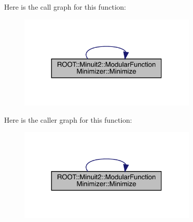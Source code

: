 Here is the call graph for this function\+:\nopagebreak
\begin{figure}[H]
\begin{center}
\leavevmode
\includegraphics[width=242pt]{d3/dc8/classROOT_1_1Minuit2_1_1ModularFunctionMinimizer_a83b8641b6e3662f763c79c3fcb014838_cgraph}
\end{center}
\end{figure}
Here is the caller graph for this function\+:\nopagebreak
\begin{figure}[H]
\begin{center}
\leavevmode
\includegraphics[width=242pt]{d3/dc8/classROOT_1_1Minuit2_1_1ModularFunctionMinimizer_a83b8641b6e3662f763c79c3fcb014838_icgraph}
\end{center}
\end{figure}
\mbox{\label{classROOT_1_1Minuit2_1_1ModularFunctionMinimizer_a1cab3c0cc40932cb9287232fe9cf7437}} 
